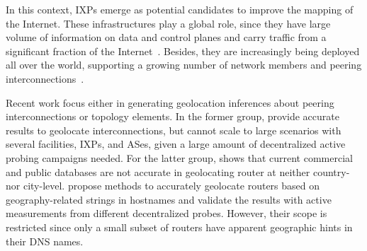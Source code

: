 
	In this context, IXPs emerge as potential candidates to improve the mapping of the Internet. These infrastructures play a global role, since they have large volume of information on data and control planes and carry traffic from a significant fraction of the Internet~\cite{Chatzis:2013:BUL:2504730.2504746}. Besides, they are increasingly being deployed all over the world, supporting a growing number of network members and peering interconnections~\cite{Giotsas:2017:DPI:3098822.3098855}.

	Recent work focus either in generating geolocation inferences about peering interconnections or topology elements. In the former group, \cite{Giotsas:2015:MPI:2716281.2836122, Augustin:2009:IM:1644893.1644934} provide accurate results to geolocate interconnections, but cannot scale to large scenarios with several facilities, IXPs, and ASes, given a large amount of decentralized active probing campaigns needed. For the latter group, \cite{Gharaibeh:2017:LRG:3131365.3131380} shows that current commercial and public databases are not accurate in geolocating router at neither country- nor city-level. \cite{Huffaker:2014:DDR:2656877.2656879, 8002903} propose methods to accurately geolocate routers based on geography-related strings in hostnames and validate the results with active measurements from different decentralized probes. However, their scope is restricted since only a small subset of routers have apparent geographic hints in their DNS names.
	


